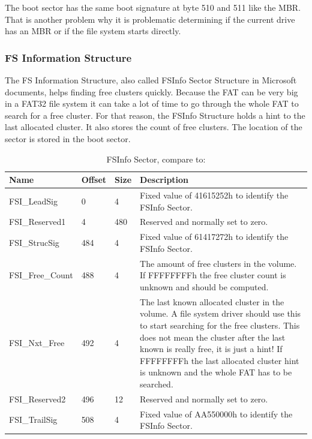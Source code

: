 The boot sector has the same boot signature at byte 510 and 511 like the MBR. That is another problem why it is problematic determining if the current drive has an MBR or if the file system starts directly.

\newpage

\subsubsection{FS Information Structure}

The FS Information Structure, also called FSInfo Sector Structure in Microsoft documents, helps finding free clusters quickly. Because the FAT can be very big in a FAT32 file system it can take a lot of time to go through the whole FAT to search for a free cluster. For that reason, the FSInfo Structure holds a hint to the last allocated cluster. It also stores the count of free clusters. The location of the sector is stored in the boot sector.

\begin{table}[!ht]
\caption{FSInfo Sector, compare to: \cite{fatgen103}}
\centering
\begin{tabular}{|l|l|l|p{9cm}|}
\hline\hline
\textbf{Name} & \textbf{Offset} & \textbf{Size} & \textbf{Description}\\ \hline
FSI\_LeadSig & 0 & 4 & Fixed value of 41615252h to identify the FSInfo Sector. \\ \hline
FSI\_Reserved1 & 4 & 480 & Reserved and normally set to zero. \\ \hline
FSI\_StrucSig & 484 & 4 & Fixed value of 61417272h to identify the FSInfo Sector. \\ \hline
FSI\_Free\_Count & 488 & 4 & The amount of free clusters in the volume. If FFFFFFFFh the free cluster count is unknown and should be computed. \\ \hline
FSI\_Nxt\_Free & 492 & 4 & The last known allocated cluster in the volume. A file system driver should use this to start searching for the free clusters. This does not mean the cluster after the last known is really free, it is just a hint! If FFFFFFFFh the last allocated cluster hint is unknown and the whole FAT has to be searched. \\ \hline
FSI\_Reserved2 & 496 & 12 & Reserved and normally set to zero. \\ \hline
FSI\_TrailSig & 508 & 4 & Fixed value of AA550000h to identify the FSInfo Sector. \\ \hline
\end{tabular}
\label{table:fat_fs_info}
\end{table}

